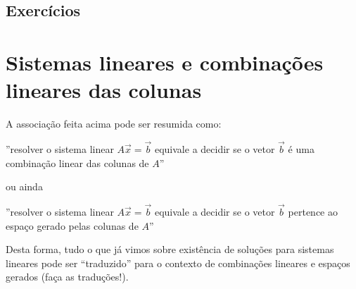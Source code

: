 \subsection*{Exercícios}

\construirExer




\section{Sistemas lineares e combinações lineares das colunas}

A associação feita acima pode ser resumida como:
\begin{center}
  ''resolver o sistema linear $A \vec{x} = \vec{b}$ equivale a decidir
  se o vetor $\vec{b}$ é uma combinação linear das colunas de $A$''
\end{center}
ou ainda
\begin{center}
  ''resolver o sistema linear $A \vec{x} = \vec{b}$ equivale a decidir se o vetor $\vec{b}$ pertence ao espaço gerado pelas colunas de $A$''
\end{center}

Desta forma, tudo o que já vimos sobre existência de soluções para sistemas lineares pode ser ``traduzido'' para o contexto de combinações lineares e espaços gerados (faça as traduções!).


